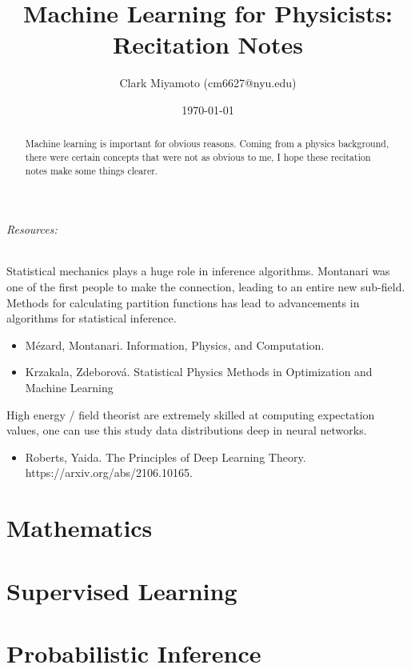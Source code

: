 \documentclass[12pt,fleqn]{article}
\title{Machine Learning for Physicists: Recitation Notes}
\author{Clark Miyamoto (cm6627@nyu.edu)}
\date{\today}
\numberwithin{equation}{section} %
\begin{document}
\maketitle

\begin{abstract}
	Machine learning is important for obvious reasons. Coming from a physics background, there were certain concepts that were not as obvious to me, I hope these recitation notes make some things clearer.
\end{abstract}
\paragraph{Resources:}

Statistical mechanics plays a huge role in inference algorithms. Montanari was one of the first people to make the connection, leading to an entire new sub-field. Methods for calculating partition functions has lead to advancements in algorithms for statistical inference.
\begin{itemize}
	\item M\'ezard, Montanari. Information, Physics, and Computation.
	\item Krzakala, Zdeborov\'a. Statistical Physics Methods in Optimization and Machine Learning
\end{itemize}
High energy / field theorist are extremely skilled at computing expectation values, one can use this study data distributions deep in neural networks.
\begin{itemize}
	\item Roberts, Yaida. The Principles of Deep Learning Theory. https://arxiv.org/abs/2106.10165.
\end{itemize}

\tableofcontents


\newpage

\part{Mathematics}

\newpage





\newpage
\part{Supervised Learning}

\newpage





\newpage
\part{Probabilistic Inference}



\newpage

\end{document}

